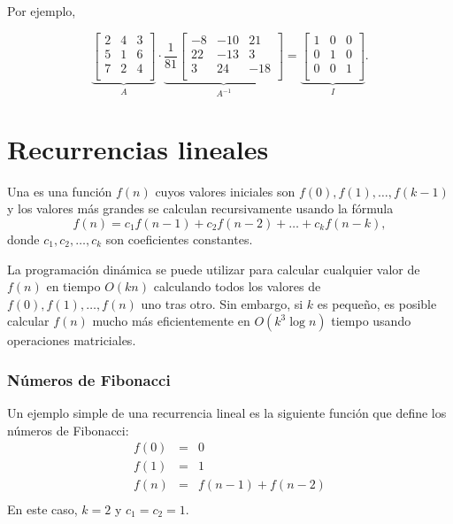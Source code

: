Por ejemplo,

\[
\underbrace{
 \begin{bmatrix}
  2 & 4 & 3\\
  5 & 1 & 6\\
  7 & 2 & 4\\
 \end{bmatrix}
}_{A}
\cdot
\underbrace{
 \frac{1}{81}
 \begin{bmatrix}
   -8 & -10 & 21 \\
   22 & -13 & 3 \\
   3 & 24 & -18 \\
 \end{bmatrix}
}_{A^{-1}}
=
\underbrace{
 \begin{bmatrix}
  1 & 0 & 0 \\
  0 & 1 & 0 \\
  0 & 0 & 1 \\
 \end{bmatrix}
}_{I}.
\]

\section{Recurrencias lineales}


Una 
es una función $f(n)$
cuyos valores iniciales son
$f(0),f(1),\ldots,f(k-1)$
y los valores más grandes
se calculan recursivamente usando la fórmula
\[f(n) = c_1 f(n-1) + c_2 f(n-2) + \ldots + c_k f (n-k),\]
donde $c_1,c_2,\ldots,c_k$ son coeficientes constantes.

La programación dinámica se puede utilizar para calcular
cualquier valor de $f(n)$ en tiempo $O(kn)$ calculando
todos los valores de $f(0),f(1),\ldots,f(n)$ uno tras otro.
Sin embargo, si $k$ es pequeño, es posible calcular
$f(n)$ mucho más eficientemente en $O(k^3 \log n)$
tiempo usando operaciones matriciales.

\subsubsection{Números de Fibonacci}


Un ejemplo simple de una recurrencia lineal es la
siguiente función que define los números de Fibonacci:
\[
\begin{array}{lcl}
f(0) & = & 0 \\
f(1) & = & 1 \\
f(n) & = & f(n-1)+f(n-2) \\
\end{array}
\]
En este caso, $k=2$ y $c_1=c_2=1$.

